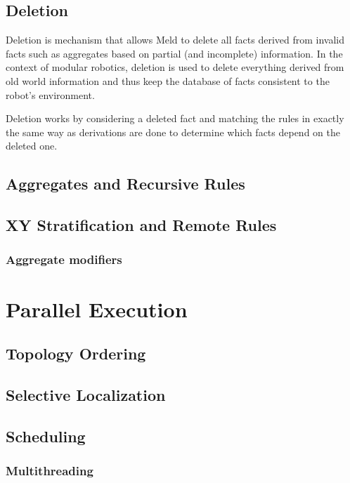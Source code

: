 \documentclass[preprint]{sigplanconf}
\begin{document}
\subsection{Deletion}

Deletion is mechanism that allows Meld to delete all facts derived from invalid facts such
as aggregates based on partial (and incomplete) information. In the context of modular robotics,
deletion is used to delete everything derived from old world information and thus keep the database
of facts consistent to the robot's environment.

Deletion works by considering a deleted fact and matching the rules in exactly the same way as
derivations are done to determine which facts depend on the deleted one.


\subsection{Aggregates and Recursive Rules}

\cite{zaniolo-arni-ong-dood93}

\subsection{XY Stratification and Remote Rules}

\subsubsection{Aggregate modifiers}

\section{Parallel Execution}

\subsection{Topology Ordering}\label{sec:topology}

\subsection{Selective Localization}

\subsection{Scheduling}

\subsubsection{Multithreading}
\end{document}
